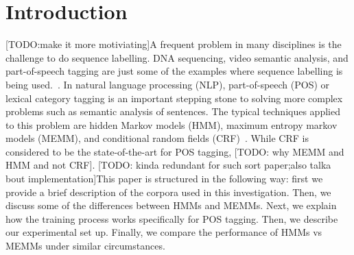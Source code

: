 \section{Introduction}
[TODO:make it more motiviating]A frequent problem in many disciplines is the challenge to do sequence labelling. DNA sequencing, video semantic analysis, and part-of-speech tagging are just some of the examples where sequence labelling is being used.~\cite{dnaEx, videoEx, nlpEx}. In natural language processing (NLP), part-of-speech (POS) or lexical category tagging is an important stepping stone to solving more complex problems such as semantic analysis of sentences. The typical techniques applied to this problem are hidden Markov models (HMM), maximum entropy markov models (MEMM), and conditional random fields (CRF)~\cite{nlpBook}. While CRF is considered to be the state-of-the-art for POS tagging, [TODO: why MEMM and HMM and not CRF]. [TODO: kinda redundant for such sort paper;also talka bout implementation]This paper is structured in the following way: first we provide a brief description of the corpora used in this investigation. Then, we discuss some of the differences between HMMs and MEMMs. Next, we explain how the training process works specifically for POS tagging. Then, we describe our experimental set up. Finally, we compare the performance of HMMs vs MEMMs under similar circumstances.

